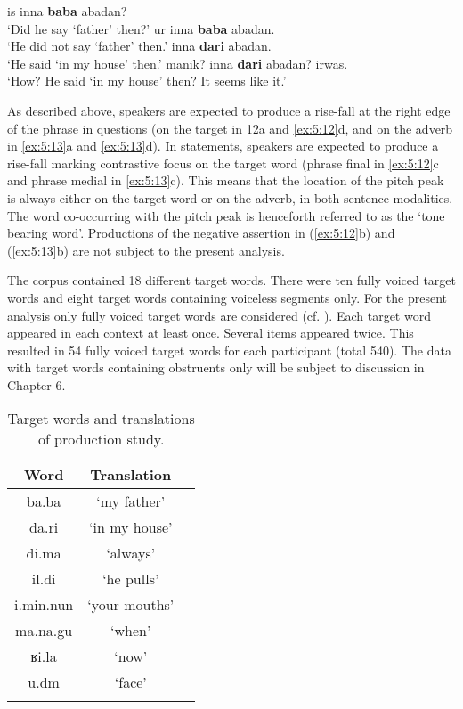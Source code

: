 \begin{exe}
\ex\label{ex:5:13} \begin{xlist}
                \ex\label{ex:5:13a} is inna \textbf{baba} abadan? \\		
                ‘Did he say ‘father’ then?’	
                \ex\label{ex:5:13b} ur inna \textbf{baba} abadan. \\			
                ‘He did not say ‘father’ then.’
                \ex\label{ex:5:13c} inna \textbf{dari} abadan. \\				
                ‘He said ‘in my house’ then.’
                \ex\label{ex:5:13d} manik? inna \textbf{dari} abadan? irwas. \\	 	
                ‘How? He said ‘in my house’ then? It seems like it.’
\end{xlist}
\end{exe} 

As described above, speakers are expected to produce a rise-fall at the right edge of the phrase in questions (on the target in 12a and \ref{ex:5:12}d, and on the adverb in \ref{ex:5:13}a and \ref{ex:5:13}d). In statements, speakers are expected to produce a rise-fall marking contrastive focus on the target word (phrase final in \ref{ex:5:12}c and phrase medial in \ref{ex:5:13}c). This means that the location of the pitch peak is always either on the target word or on the adverb, in both sentence modalities. The word co-occurring with the pitch peak is henceforth referred to as the ‘tone bearing word’. Productions of the negative assertion in (\ref{ex:5:12}b) and (\ref{ex:5:13}b) are not subject to the present analysis. 

The corpus contained 18 different target words. There were ten fully voiced target words and eight target words containing voiceless segments only. For the present analysis only fully voiced target words are considered (cf. ). Each target word appeared in each context at least once. Several items appeared twice. This resulted in 54 fully voiced target words for each participant (total 540). The data with target words containing obstruents only will be subject to discussion in Chapter 6. 

\begin{table}
  \begin{tabular}{ccc}
    \lsptoprule
\textbf{Word}  & \textbf{Translation} \\
    \midrule
ba.ba & ‘my father'\\
da.ri & ‘in my house'\\
di.ma & ‘always'\\
il.di & ‘he pulls'\\
i.min.nun & ‘your mouths'\\
ma.na.gu & ‘when'\\
ʁi.la & ‘now'\\
u.dm & ‘face'\\
\lspbottomrule
  \end{tabular}
  \caption{Target words and translations of production study.}
  \label{tab:5.1}
\end{table} 

